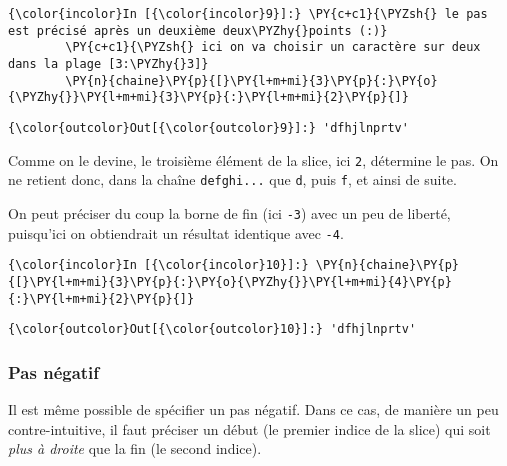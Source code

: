    \begin{Verbatim}[commandchars=\\\{\},frame=single,framerule=0.3mm,rulecolor=\color{cellframecolor}]
{\color{incolor}In [{\color{incolor}9}]:} \PY{c+c1}{\PYZsh{} le pas est précisé après un deuxième deux\PYZhy{}points (:)}
        \PY{c+c1}{\PYZsh{} ici on va choisir un caractère sur deux dans la plage [3:\PYZhy{}3]}
        \PY{n}{chaine}\PY{p}{[}\PY{l+m+mi}{3}\PY{p}{:}\PY{o}{\PYZhy{}}\PY{l+m+mi}{3}\PY{p}{:}\PY{l+m+mi}{2}\PY{p}{]}
\end{Verbatim}


\begin{Verbatim}[commandchars=\\\{\},frame=single,framerule=0.3mm,rulecolor=\color{cellframecolor}]
{\color{outcolor}Out[{\color{outcolor}9}]:} 'dfhjlnprtv'
\end{Verbatim}
            
    Comme on le devine, le troisième élément de la slice, ici \texttt{2},
détermine le pas. On ne retient donc, dans la chaîne \texttt{defghi...}
que \texttt{d}, puis \texttt{f}, et ainsi de suite.

On peut préciser du coup la borne de fin (ici \texttt{-3}) avec un peu
de liberté, puisqu'ici on obtiendrait un résultat identique avec
\texttt{-4}.

    \begin{Verbatim}[commandchars=\\\{\},frame=single,framerule=0.3mm,rulecolor=\color{cellframecolor}]
{\color{incolor}In [{\color{incolor}10}]:} \PY{n}{chaine}\PY{p}{[}\PY{l+m+mi}{3}\PY{p}{:}\PY{o}{\PYZhy{}}\PY{l+m+mi}{4}\PY{p}{:}\PY{l+m+mi}{2}\PY{p}{]}
\end{Verbatim}


\begin{Verbatim}[commandchars=\\\{\},frame=single,framerule=0.3mm,rulecolor=\color{cellframecolor}]
{\color{outcolor}Out[{\color{outcolor}10}]:} 'dfhjlnprtv'
\end{Verbatim}
            
    \hypertarget{pas-nuxe9gatif}{%
\subsubsection{Pas négatif}\label{pas-nuxe9gatif}}

    Il est même possible de spécifier un pas négatif. Dans ce cas, de
manière un peu contre-intuitive, il faut préciser un début (le premier
indice de la slice) qui soit \emph{plus à droite} que la fin (le second
indice).

